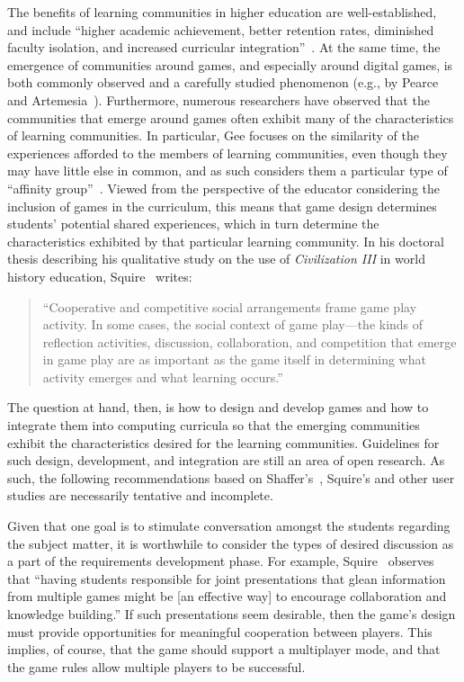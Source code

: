 \documentclass{sig-alternate-05-2015}
\begin{document}
The benefits of learning communities in higher education are well-established, and include ``higher academic achievement, better retention rates, diminished faculty isolation, and increased curricular integration''~\cite{lenning1999powerful}. At the same time, the emergence of communities around games, and especially around digital games, is both commonly observed and a carefully studied phenomenon (e.g., by Pearce and Artemesia~\cite{pearce2011communities}). Furthermore, numerous researchers have observed that the communities that emerge around games often exhibit many of the characteristics of learning communities. In particular, Gee focuses on the similarity of the experiences afforded to the members of learning communities, even though they may have little else in common, and as such considers them a particular type of ``affinity group''~\cite{gee2000identity}. Viewed from the perspective of the educator considering the inclusion of games in the curriculum, this means that game design determines students' potential shared experiences, which in turn determine the characteristics exhibited by that particular learning community. In his doctoral thesis describing his qualitative study on the use of {\em Civilization III} in world history education, Squire~\cite{squire2004replaying} writes:

\begin{quote}


``Cooperative and competitive social arrangements frame game play activity. In some cases, the social context of game play---the kinds of reflection activities, discussion, collaboration, and competition that emerge in game play are as important as the game itself in determining what activity emerges and what learning occurs.''\end{quote}




The question at hand, then, is how to design and develop games and how to integrate them into computing curricula so that the emerging communities exhibit the characteristics desired for the learning communities. Guidelines for such design, development, and integration are still an area of open research. As such, the following recommendations based on Shaffer's~\cite{shaffer2012online}, Squire's and other user studies are necessarily tentative and incomplete. 



Given that one goal is to stimulate conversation amongst the students regarding the subject matter, it is worthwhile to consider the types of desired discussion as a part of the requirements development phase. For example, Squire~\cite{squire2004replaying} observes that ``having students responsible for joint presentations that glean information from multiple games might be [an effective way] to encourage collaboration and knowledge building.'' If such presentations seem desirable, then the game's design must provide opportunities for meaningful cooperation between players. This implies, of course, that the game should support a multiplayer mode, and that the game rules allow multiple players to be successful.
\end{document}
